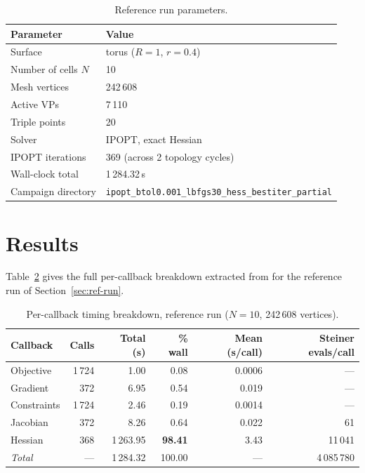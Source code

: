 \documentclass[11pt,a4paper]{article}
\begin{document}
\begin{table}[H]
\centering
\caption{Reference run parameters.}
\label{tab:reference-run}
\renewcommand{\arraystretch}{1.2}
\begin{tabular}{ll}
\toprule
\textbf{Parameter} & \textbf{Value} \\
\midrule
Surface             & torus ($R=1$, $r=0.4$) \\
Number of cells $N$ & 10 \\
Mesh vertices       & 242\,608 \\
Active VPs          & 7\,110 \\
Triple points       & 20 \\
Solver              & IPOPT, exact Hessian \\
IPOPT iterations    & 369 (across 2 topology cycles) \\
Wall-clock total    & 1\,284.32\,s \\
Campaign directory  & \small\texttt{ipopt\_btol0.001\_lbfgs30\_hess\_bestiter\_partial} \\
\bottomrule
\end{tabular}
\end{table}

\section{Results}
\label{sec:results}

Table~\ref{tab:reference-breakdown} gives the full per-callback
breakdown extracted from  for the reference
run of Section~\ref{sec:ref-run}.

\begin{table}[H]
\centering
\caption{Per-callback timing breakdown, reference run ($N=10$, 242\,608 vertices).}
\label{tab:reference-breakdown}
\renewcommand{\arraystretch}{1.25}
\begin{tabular}{lrrrrr}
\toprule
\textbf{Callback} & \textbf{Calls} & \textbf{Total (s)} &
  \textbf{\% wall} & \textbf{Mean (s/call)} & \textbf{Steiner evals/call} \\
\midrule
Objective    & 1\,724 &     1.00  &  0.08          & 0.0006 & --- \\
Gradient     &   372  &     6.95  &  0.54          & 0.019  & --- \\
Constraints  & 1\,724 &     2.46  &  0.19          & 0.0014 & --- \\
Jacobian     &   372  &     8.26  &  0.64          & 0.022  & 61 \\
Hessian      &   368  & 1\,263.95 & \textbf{98.41} & 3.43   & 11\,041 \\
\midrule
\textit{Total} & --- & 1\,284.32 & 100.00 & --- & 4\,085\,780 \\
\bottomrule
\end{tabular}
\end{table}
\end{document}
